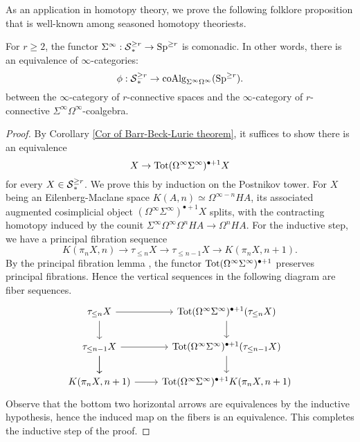     As an application in homotopy theory, we prove the following folklore proposition that is well-known among seasoned homotopy theoriests.
\begin{proposition}
	\label{Coalgebra model for simply-connected spaces}
	For $r\geq 2$, the functor $\Sigma^{\infty}:\operatorname{\mathcal{S}}^{\geq r}_{*} \to \operatorname{Sp}^{\geq r}$ is comonadic. In other words, there is an equivalence of $\infty$-categories:
	\[
	\phi: \operatorname{\mathcal{S}}^{\geq r}_{*} \to \operatorname{coAlg}_{\Sigma^{\infty}\Omega^{\infty}}(\operatorname{Sp}^{\geq r}).
	\]
 between the $\infty$-category of $r$-connective spaces and the $\infty$-category of $r$-connective $\Sigma^{\infty}\Omega^{\infty}$-coalgebra.
\end{proposition}
\begin{proof}
By Corollary \ref{Cor of Barr-Beck-Lurie theorem}, it suffices to show there is an equivalence 
$$
X\to \operatorname{\operatorname{Tot}} (\Omega^{\infty}\Sigma^{\infty})^{\bullet+1}X
$$
for every $X\in \operatorname{\mathcal{S}}_{*}^{\geq r}$. We prove this by induction on the Postnikov tower. For $X$ being an Eilenberg-Maclane space $K(A,n)\simeq \Omega^{\infty-n}HA$, its associated augmented cosimplicial object $(\Omega^{\infty}\Sigma^{\infty})^{\bullet+1}X$ splits, with the contracting homotopy induced by the counit $\Sigma^{\infty}\Omega^{\infty} \Omega^n HA\to \Omega^n HA$. For the inductive step, we have a principal fibration sequence
\[
K(\pi_n X,n) \to \tau_{\leq n}X \to \tau_{\leq n-1}X 
\to 
K(\pi_n X,n+1).
\]
By the principal fibration lemma \cite{Bousfield-KanYellow}, the functor $\operatorname{\operatorname{Tot}} (\Omega^{\infty}\Sigma^{\infty})^{\bullet+1}$ preserves principal fibrations. Hence the vertical sequences in the following diagram are fiber sequences.
\[
\begin{tikzcd}
	\tau_{\leq n}X & \Tot (\Omega^{\infty}\Sigma^{\infty})^{\bullet+1} (\tau_{\leq n}X)\\
	\tau_{\leq n-1}X  & \Tot (\Omega^{\infty}\Sigma^{\infty})^{\bullet+1} (\tau_{\leq n-1}X)\\
	K(\pi_n X,n+1)   & \Tot (\Omega^{\infty}\Sigma^{\infty})^{\bullet+1} K(\pi_n X,n+1)
	\arrow[from=1-1, to=1-2]
	\arrow[from=1-1, to=2-1]
	\arrow[from=2-1, to=2-2]
	\arrow[from=1-2, to=2-2]
	\arrow[from=2-1, to=3-1]
	\arrow[from=3-1, to=3-2]
	\arrow[from=2-1, to=3-1]
	\arrow[from=2-2, to=3-2]
\end{tikzcd}
\]
Observe that the bottom two horizontal arrows are equivalences by the inductive hypothesis, hence the induced map on the fibers is an equivalence. This completes the inductive step of the proof.
\end{proof}







